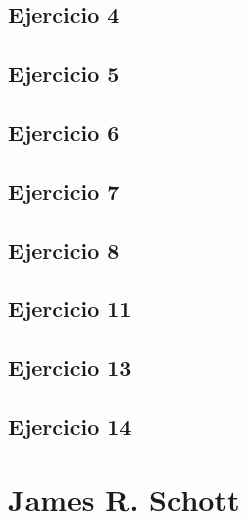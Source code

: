 \documentclass[12pt]{article}
\begin{document}
\subsection{Ejercicio 4}
 

\subsection{Ejercicio 5}
 

\subsection{Ejercicio 6}
 

\subsection{Ejercicio 7}
 

\subsection{Ejercicio 8}
 

\subsection{Ejercicio 11}
 

\subsection{Ejercicio 13}
 

\subsection{Ejercicio 14}
 


\section{James  R.  Schott}

\end{document}
